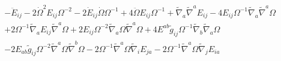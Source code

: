 \documentclass[10pt,letterpaper]{article}
\numberwithin{equation}{section}
\begin{document}
\begin{eqnarray}
\nonumber\\
&&- \ddot{E}_{ij}
- 2 \dot{\Omega}^2 E_{ij} \Omega^{-2}
- 2 \dot{E}_{ij} \dot{\Omega} \Omega^{-1}
+ 4 \ddot{\Omega} E_{ij} \Omega^{-1}
+ \tilde{\nabla}_{a}\tilde{\nabla}^{a}E_{ij}
- 4 E_{ij} \Omega^{-1} \tilde{\nabla}_{a}\tilde{\nabla}^{a}\Omega\nonumber\\
&& + 2 \Omega^{-1} \tilde{\nabla}_{a}E_{ij} \tilde{\nabla}^{a}\Omega
+ 2 E_{ij} \Omega^{-2} \tilde{\nabla}_{a}\Omega \tilde{\nabla}^{a}\Omega
+ 4 E^{ab} \tilde{g}_{ij} \Omega^{-1} \tilde{\nabla}_{b}\tilde{\nabla}_{a}\Omega\nonumber\\
&& - 2 E_{ab} \tilde{g}_{ij} \Omega^{-2} \tilde{\nabla}^{a}\Omega \tilde{\nabla}^{b}\Omega
- 2 \Omega^{-1} \tilde{\nabla}^{a}\Omega \tilde{\nabla}_{i}E_{ja}
- 2 \Omega^{-1} \tilde{\nabla}^{a}\Omega \tilde{\nabla}_{j}E_{ia}
\end{eqnarray}
%
\end{document}
